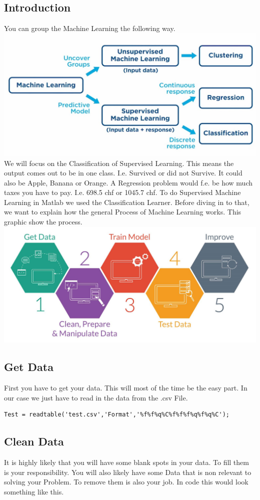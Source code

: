 \documentclass[
   10.5pt,
   invert-title=true,
   titlepage=false,
   titleimage-ratio=13,
   class=article
]{bfhpub}				%
\begin{document}
\begin{multicols}{2}
\section*{Introduction}
You can group the Machine Learning the following way. 
\includegraphics[width=70mm\\]{overview}
We will focus on the Classification of Supervised Learning. This means the output comes out to be in one class. I.e. Survived or did not Survive. It could also be Apple, Banana or Orange. A Regression problem would f.e. be how much taxes you have to pay. I.e. 698.5 chf or 1045.7 chf. To do Supervised Machine Learning in Matlab we used the Classification Learner. Before diving in to that, we want to explain how the general Process of Machine Learning works. This graphic show the process.
\includegraphics[width=70mm\\]{process}
\subsection*{Get Data}
First you have to get your data. This will most of the time be the easy part. In our case we just have to read in the data from the .csv File.
\begin{lstlisting}[style=CStyle]
Test = readtable('test.csv','Format','%f%f%q%C%f%f%f%q%f%q%C');
\end{lstlisting}

\subsection*{Clean Data}
It is highly likely that you will have some blank spots in your data. To fill them is your responsibility. You will also likely have some Data that is non relevant to solving your Problem. To remove them is also your job. In code this would look something like this.


\end{multicols}
\end{document}

